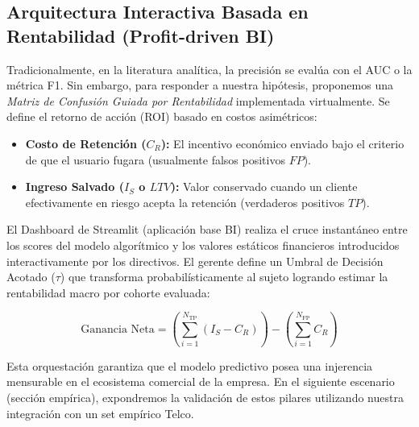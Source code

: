 \subsection{Arquitectura Interactiva Basada en Rentabilidad (Profit-driven BI)}
Tradicionalmente, en la literatura analítica, la precisión se evalúa con el AUC o la métrica F1. Sin embargo, para responder a nuestra hipótesis, proponemos una \textit{Matriz de Confusión Guiada por Rentabilidad} implementada virtualmente. 
Se define el retorno de acción (ROI) basado en costos asimétricos:
\begin{itemize}
    \item \textbf{Costo de Retención ($C_R$):} El incentivo económico enviado bajo el criterio de que el usuario fugara (usualmente falsos positivos $FP$).
    \item \textbf{Ingreso Salvado ($I_S$ o $LTV$):} Valor conservado cuando un cliente efectivamente en riesgo acepta la retención (verdaderos positivos $TP$).
\end{itemize}

El Dashboard de Streamlit (aplicación base BI) realiza el cruce instantáneo entre los scores del modelo algorítmico y los valores estáticos financieros introducidos interactivamente por los directivos. El gerente define un Umbral de Decisión Acotado ($\tau$) que transforma probabilísticamente al sujeto logrando estimar la rentabilidad macro por cohorte evaluada: 

\begin{equation}
  \text{Ganancia Neta} = \left( \sum_{i=1}^{N_{\text{TP}}} (I_S - C_R) \right) - \left( \sum_{i=1}^{N_{\text{FP}}} C_R \right)
\end{equation}

Esta orquestación garantiza que el modelo predictivo posea una injerencia mensurable en el ecosistema comercial de la empresa. En el siguiente escenario (sección empírica), expondremos la validación de estos pilares utilizando nuestra integración con un set empírico Telco.
